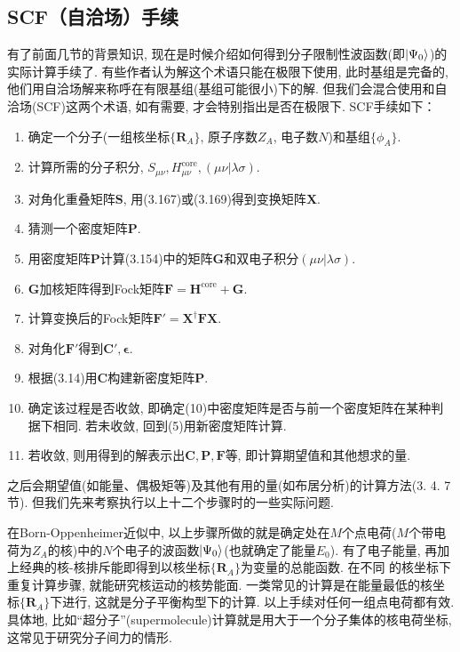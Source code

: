 \subsection{SCF（自洽场）手续}
有了前面几节的背景知识, 
现在是时候介绍如何得到分子限制性波函数(即$\Ket{\Psi_0}$)的实际计算手续了. 
有些作者认为\hft 解这个术语只能在\hft 极限下使用, 
此时基组是完备的, 
他们用自洽场解来称呼在有限基组(基组可能很小)下的解. 
但我们会混合使用\hft 和自洽场(SCF)这两个术语, 
如有需要, 
才会特别指出是否在\hft 极限下. 
SCF手续如下：
\begin{enumerate}[1.]
	\item 确定一个分子(一组核坐标$\{\mathbf{R}_A\}$, 原子序数$Z_A$, 电子数$N$)和基组$\{\phi_A\}$.
	\item 计算所需的分子积分, $S_{\mu\nu},H_{\mu\nu}^\mathrm{core}, (\mu\nu|\lambda\sigma)$.
	\item 对角化重叠矩阵$\mathbf{S}$, 用(3.167)或(3.169)得到变换矩阵$\mathbf{X}$.
	\item 猜测一个密度矩阵$\mathbf{P}$.
	\item 用密度矩阵$\mathbf{P}$计算(3.154)中的矩阵$\mathbf{G}$和双电子积分$(\mu\nu|\lambda\sigma)$.
	\item $\mathbf{G}$加核\ha 矩阵得到Fock矩阵$\mathbf{F=H}^\mathrm{core}+\mathbf{G}$.
	\item 计算变换后的Fock矩阵$\mathbf{F'=X^\dagger FX}$.
	\item 对角化$\mathbf{F'}$得到$\mathbf{C'},\bm{\epsilon}$.
	\item 根据(3.14)用$\mathbf{C}$构建新密度矩阵$\mathbf{P}$.
	\item 确定该过程是否收敛, 即确定(10)中密度矩阵是否与前一个密度矩阵在某种判据下相同. 若未收敛, 回到(5)用新密度矩阵计算.
	\item 若收敛, 则用得到的解表示出$\mathbf{C,P,F}$等, 即计算期望值和其他想求的量.
\end{enumerate}
之后会期望值(如能量、偶极矩等)及其他有用的量(如布居分析)的计算方法(3.
4.
7节). 
但我们先来考察执行以上十二个步骤时的一些实际问题.


在Born-Oppenheimer近似中, 
以上步骤所做的就是确定处在$M$个点电荷($M$个带电荷为$Z_A$的核)中的$N$个电子的波函数$\Ket{\Psi_0}$(也就确定了能量$E_0$). 
有了电子能量, 
再加上经典的核-核排斥能即得到以核坐标$\{\mathbf{R}_A\}$为变量的总能函数. 
在不同 的核坐标下重复计算步骤, 
就能研究核运动的核势能面. 
一类常见的计算是在能量最低的核坐标$\{\mathbf{R}_A\}$下进行, 
这就是分子平衡构型下的计算. 
以上手续对任何一组点电荷都有效. 
具体地, 
比如``超分子''(supermolecule)计算就是用大于一个分子集体的核电荷坐标, 
这常见于研究分子间力的情形.


